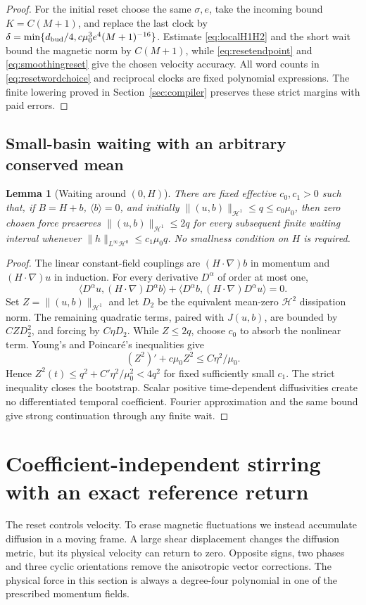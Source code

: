 \documentclass[11pt,a4paper]{amsart}
\newtheorem{lemma}[theorem]{Lemma}
\theoremstyle{definition}
\theoremstyle{remark}
\numberwithin{equation}{section}
\newcommand{\Hcal}{\mathcal H}
\newcommand{\ip}[2]{\langle #1,#2\rangle}
\newcommand{\norm}[1]{\lVert #1\rVert}
\newcommand{\mean}[1]{\langle #1\rangle}
\begin{document}
\begin{proof}
For the initial reset choose the same $\sigma,e$, take the incoming bound $K=C(M+1)$, and replace the last clock by
$\delta=\min\{d_{\rm bud}/4,c\mu_0^3e^4(M+1)^{-16}\}$. Estimate \eqref{eq:localH1H2} and the short wait bound the magnetic norm by $C(M+1)$, while \eqref{eq:resetendpoint} and \eqref{eq:smoothingreset} give the chosen velocity accuracy. All word counts in \eqref{eq:resetwordchoice} and reciprocal clocks are fixed polynomial expressions. The finite lowering proved in Section~\ref{sec:compiler} preserves these strict margins with paid errors.
\end{proof}

\subsection{Small-basin waiting with an arbitrary conserved mean}
\begin{lemma}[Waiting around $(0,H)$]\label{lem:waiting}
There are fixed effective $c_0,c_1>0$ such that, if $B=H+b$, $\mean b=0$, and initially
$\norm{(u,b)}_{\Hcal^1}\le q\le c_0\mu_0$, then zero chosen force preserves
$\norm{(u,b)}_{\Hcal^1}\le2q$ for every subsequent finite waiting interval whenever $\norm h_{L^\infty\Hcal^0}\le c_1\mu_0q$. No smallness condition on $H$ is required.
\end{lemma}
\begin{proof}
The linear constant-field couplings are $(H\cdot\nabla)b$ in momentum and $(H\cdot\nabla)u$ in induction. For every derivative $D^\alpha$ of order at most one,
\[
 \ip{D^\alpha u}{(H\cdot\nabla)D^\alpha b}
 +\ip{D^\alpha b}{(H\cdot\nabla)D^\alpha u}=0.
\]
Set $Z=\norm{(u,b)}_{\Hcal^1}$ and let $D_2$ be the equivalent mean-zero $\Hcal^2$ dissipation norm. The remaining quadratic terms, paired with $J(u,b)$, are bounded by $CZ D_2^2$, and forcing by $C\eta D_2$. While $Z\le2q$, choose $c_0$ to absorb the nonlinear term. Young's and Poincar\'e's inequalities give
\[
 (Z^2)'+c\mu_0Z^2\le C\eta^2/\mu_0.
\]
Hence $Z^2(t)\le q^2+C'\eta^2/\mu_0^2<4q^2$ for fixed sufficiently small $c_1$. The strict inequality closes the bootstrap. Scalar positive time-dependent diffusivities create no differentiated temporal coefficient. Fourier approximation and the same bound give strong continuation through any finite wait.
\end{proof}



\section{Coefficient-independent stirring with an exact reference return}\label{sec:stirring}
The reset controls velocity. To erase magnetic fluctuations we instead accumulate diffusion in a moving frame. A large shear displacement changes the diffusion metric, but its physical velocity can return to zero. Opposite signs, two phases and three cyclic orientations remove the anisotropic vector corrections. The physical force in this section is always a degree-four polynomial in one of the prescribed momentum fields.
\end{document}
